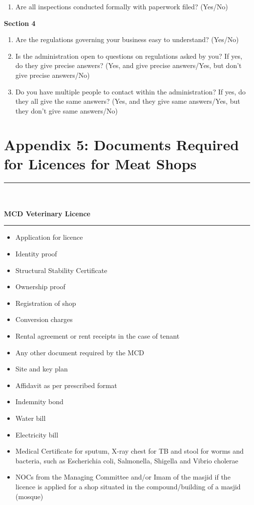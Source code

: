 \documentclass[a4paper, 12pt, twoside]{article}
\begin{document}
\begin{mdframed}[backgroundcolor=gray!20]
\begin{enumerate}[noitemsep]
\item Are all inspections conducted formally with paperwork filed? (Yes/No)
\end{enumerate}
\textbf {Section 4}
\begin{enumerate}[noitemsep]
\item Are the regulations governing your business easy to understand? (Yes/No)
\item Is the administration open to questions on regulations asked by you? If yes, do they give precise answers? (Yes, and give precise answers/Yes, but don’t give precise answers/No)
\item Do you have multiple people to contact within the administration? If yes, do they all give the same answers? (Yes, and they give same answers/Yes, but they don’t give same 
answers/No)
\end{enumerate} 
\end{mdframed}

\newpage
\section*{Appendix 5: Documents Required for Licences for Meat Shops}
\footnotesize
\noindent\rule{16cm}{0.4pt}\\
	\\
\textbf{MCD Veterinary Licence}\\
\noindent\rule{16cm}{0.4pt}
\begin{itemize}[noitemsep]
\item  Application for licence
\item  Identity proof
\item  Structural Stability Certificate
\item  Ownership proof
\item  Registration of shop
\item  Conversion charges
\item  Rental agreement or rent receipts in the case of tenant
\item  Any other document required by the MCD
\item  Site and key plan
\item  Affidavit as per prescribed format
\item  Indemnity bond
\item  Water bill
\item  Electricity bill
\item  Medical Certificate for sputum, X-ray chest for TB and stool for worms and bacteria, such as Escherichia coli, Salmonella, Shigella and Vibrio cholerae
\item NOCs from the Managing Committee and/or Imam of the masjid if the licence is applied for a shop situated in the compound/building of a masjid (mosque)
\end{itemize}
\end{document}
